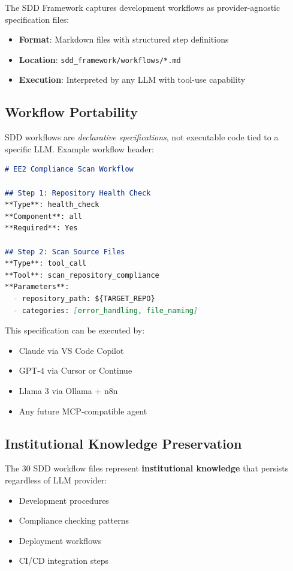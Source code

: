 \documentclass[11pt,twocolumn]{article}
\begin{document}
The SDD Framework captures development workflows as provider-agnostic specification files:

\begin{itemize}
    \item \textbf{Format}: Markdown files with structured step definitions
    \item \textbf{Location}: \texttt{sdd\_framework/workflows/*.md}
    \item \textbf{Execution}: Interpreted by any LLM with tool-use capability
\end{itemize}

\subsection{Workflow Portability}

SDD workflows are \textit{declarative specifications}, not executable code tied to a specific LLM. Example workflow header:

\begin{lstlisting}[language=markdown,caption=SDD Workflow Specification (Portable)]
# EE2 Compliance Scan Workflow

## Step 1: Repository Health Check
**Type**: health_check
**Component**: all
**Required**: Yes

## Step 2: Scan Source Files
**Type**: tool_call
**Tool**: scan_repository_compliance
**Parameters**:
  - repository_path: ${TARGET_REPO}
  - categories: [error_handling, file_naming]
\end{lstlisting}

This specification can be executed by:
\begin{itemize}
    \item Claude via VS Code Copilot
    \item GPT-4 via Cursor or Continue
    \item Llama 3 via Ollama + n8n
    \item Any future MCP-compatible agent
\end{itemize}

\subsection{Institutional Knowledge Preservation}

The 30 SDD workflow files represent \textbf{institutional knowledge} that persists regardless of LLM provider:

\begin{itemize}
    \item Development procedures
    \item Compliance checking patterns
    \item Deployment workflows
    \item CI/CD integration steps
\end{itemize}
\end{document}
